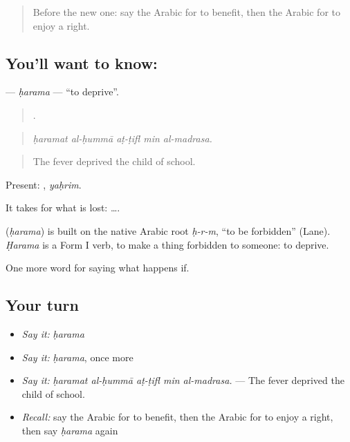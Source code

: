 \label{lesson:AR-C408-harama}



\begin{quote}
Before the new one: say the Arabic for to benefit, then the Arabic for to enjoy a right.
\end{quote}

\subsection*{You'll want to know: }
\textbf{} — \emph{ḥarama} — \textquotedblleft{}to deprive\textquotedblright{}.

\begin{quote}
    .
\end{quote}

\begin{quote}
\emph{ḥaramat al-ḥummā aṭ-ṭifl min al-madrasa.}
\end{quote}

\begin{quote}
The fever deprived the child of school.
\end{quote}

Present: , \emph{yaḥrim}.

It takes  for what is lost:   ….

\begin{cousinweb}
\textbf{} (\emph{ḥarama}) is built on the native Arabic root \emph{ḥ-r-m}, \textquotedblleft{}to be forbidden\textquotedblright{} (Lane). \emph{Ḥarama} is a Form I verb, to make a thing forbidden to someone: to deprive.
\end{cousinweb}

\begin{grammarlens}[title={What you've built}]
One more word for saying what happens if.
\end{grammarlens}

\subsection*{Your turn}
\begin{itemize}
\raggedright
  \item \emph{Say it:} \emph{ḥarama}
  \item \emph{Say it:} \emph{ḥarama}, once more
  \item \emph{Say it:} \emph{ḥaramat al-ḥummā aṭ-ṭifl min al-madrasa.} — The fever deprived the child of school.
  \item \emph{Recall:} say the Arabic for to benefit, then the Arabic for to enjoy a right, then say \emph{ḥarama} again
\end{itemize}

